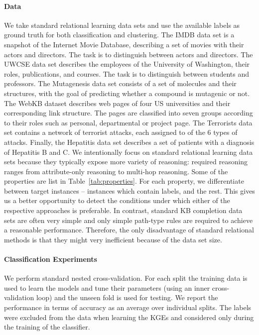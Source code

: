 \paragraph{Data}
We take standard relational learning data sets and use the available labels as ground truth for both classification and clustering.
The IMDB data set is a snapshot of the Internet Movie Database, describing a set of movies with their actors and directors. 
The task is to distinguish between actors and directors.
The UWCSE data set describes the employees of the University of Washington, their roles, publications, and courses.
The task is to distinguish between students and professors.
The Mutagenesis data set consists of a set of molecules and their structures, with the goal of predicting whether a compound is mutagenic or not.
The WebKB dataset describes web pages of four US universities and their corresponding link structure.
The pages are classified into seven groups according to their roles such as personal, departmental or project page.
The Terrorists data set contains a network of terrorist attacks, each assigned to of the 6 types of attacks.
Finally, the Hepatitis data set describes a set of patients with a diagnosis of Hepatitis B and C.
We intentionally focus on standard relational learning data sets because they typically expose more variety of reasoning: required reasoning ranges from attribute-only reasoning to multi-hop reasoning.
Some of the properties are list in Table~\ref{tab:properties}.
For each property, we differentiate between target instances -- instances which contain labels, and the rest.
This gives us a better opportunity to detect the conditions under which either of the respective approaches is preferable.
In contrast, standard KB completion data sets are often very simple and  only simple path-type rules are required to achieve a reasonable performance.
Therefore, the only disadvantage of standard relational methods is that they might very inefficient because of the data set size.



\paragraph{Classification Experiments}
We perform standard nested cross-validation. For each split the training data is used to learn the models and tune their parameters (using an inner cross-validation loop) and the unseen fold is used for testing.
We report the performance in terms of accuracy as an average over individual splits. The labels were excluded from the data when learning the KGEs and considered only during the training of the classifier.


